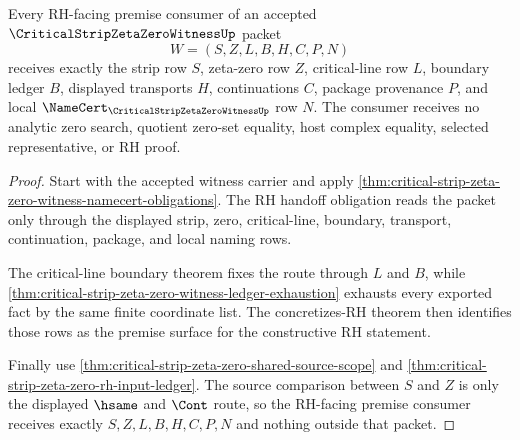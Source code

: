 \begin{theorem}
\label{thm:critical-strip-zeta-zero-rh-premise-exhaustion}
Every RH-facing premise consumer of an accepted $\CriticalStripZetaZeroWitnessUp$ packet
$$
W=(S,Z,L,B,H,C,P,N)
$$
receives exactly the strip row $S$, zeta-zero row $Z$, critical-line row $L$, boundary ledger $B$, displayed transports $H$, continuations $C$, package provenance $P$, and local $\NameCert_{\CriticalStripZetaZeroWitnessUp}$ row $N$. The consumer receives no analytic zero search, quotient zero-set equality, host complex equality, selected representative, or RH proof.
\end{theorem}
\begin{proof}
Start with the accepted witness carrier and apply \autoref{thm:critical-strip-zeta-zero-witness-namecert-obligations}. The RH handoff obligation reads the packet only through the displayed strip, zero, critical-line, boundary, transport, continuation, package, and local naming rows.

The critical-line boundary theorem fixes the route through $L$ and $B$, while \autoref{thm:critical-strip-zeta-zero-witness-ledger-exhaustion} exhausts every exported fact by the same finite coordinate list. The concretizes-RH theorem then identifies those rows as the premise surface for the constructive RH statement.

Finally use \autoref{thm:critical-strip-zeta-zero-shared-source-scope} and \autoref{thm:critical-strip-zeta-zero-rh-input-ledger}. The source comparison between $S$ and $Z$ is only the displayed $\hsame$ and $\Cont$ route, so the RH-facing premise consumer receives exactly $S,Z,L,B,H,C,P,N$ and nothing outside that packet.
\end{proof}

